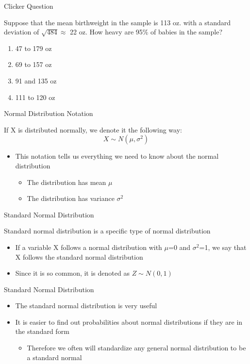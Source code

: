 \documentclass{beamer}
\begin{document}
\begin{frame}{Clicker Question}
	
	Suppose that the mean birthweight in the sample is 113 oz. with a standard deviation of $\sqrt{484} \approx$ 22 oz. How heavy are 95\% of babies in the sample?
	\begin{enumerate}[label=(\alph*)]
		\item 47 to 179 oz
		\item 69 to 157 oz
		\item 91 and 135 oz
		\item 111 to 120 oz
	\end{enumerate}
	
\end{frame}


\begin{frame}{Normal Distribution Notation}
	
	If X is distributed normally, we denote it the following way:
	$$X \sim N(\mu, \sigma^2)$$
	\begin{itemize} 
		\item This notation tells us everything we need to know about the normal distribution
		      \begin{itemize}
		      	\item The distribution has mean $\mu$
		      	\item The distribution has variance $\sigma^2$
		      \end{itemize}
	\end{itemize}
	
\end{frame}

\begin{frame}{Standard Normal Distribution}
	
	Standard normal distribution is a specific type of normal distribution
	\begin{itemize}
		\item If a variable X follows a normal distribution with $\mu$=0 and $\sigma^2$=1, we say that X follows the \alert{standard normal distribution}
			  
		\item Since it is so common, it is denoted as $Z \sim N(0,1)$
	\end{itemize}
	
\end{frame}

\begin{frame}{Standard Normal Distribution}
	
	\begin{itemize}
		\item The standard normal distribution is very useful
		      
		\item It is easier to find out probabilities about normal distributions if they are in the standard form
		      \begin{itemize}
		      	\item Therefore we often will \alert{standardize} any general normal distribution to be a standard normal
		      \end{itemize}
	\end{itemize}
\end{frame}
\end{document}
